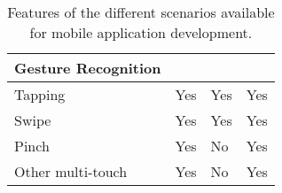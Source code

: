 \begin{table}[H]
\begin{tabularx}{15cm}{|X|X|X|X|}
\textbf{Gesture Recognition}   & \multicolumn{3}{l|}{}                                                           \\ \hline
Tapping                        & Yes                         & Yes                      & Yes                    \\ \hline
Swipe                          & Yes                         & Yes                      & Yes                    \\ \hline
Pinch                          & Yes                         & No                       & Yes                    \\ \hline
Other multi-touch              & Yes                         & No                       & Yes                    \\ \hline
\end{tabularx}
\caption{Features of the different scenarios available for mobile application development.}
\end{table}

\vfill
